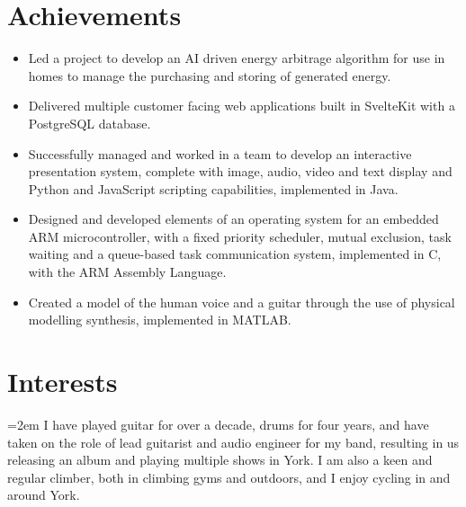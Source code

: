 \documentclass[12pt]{article} %
\newcommand{\interests}[1]{
  \vspace*{0.5em}
  \noindent\hangindent=2em\hangafter=0 \small #1 
}
\begin{document}
\section*{Achievements}
\begin{itemize}
  \item Led a project to develop an AI driven energy arbitrage algorithm for use in homes to manage the purchasing and storing of generated energy.
  \item Delivered multiple customer facing web applications built in SvelteKit with a PostgreSQL database.
  \item Successfully managed and worked in a team to develop an interactive presentation system, complete with image, audio, video and text display and Python and JavaScript scripting capabilities, implemented in Java.
  \item Designed and developed elements of an operating system for an embedded ARM microcontroller, with a fixed priority scheduler, mutual exclusion, task waiting and a queue-based task communication system, implemented in C, with the ARM Assembly Language.
  \item Created a model of the human voice and a guitar through the use of physical modelling synthesis, implemented in MATLAB.
\end{itemize}

\section*{Interests}
\interests{I have played guitar for over a decade, drums for four years, and have taken on the role of lead guitarist and audio engineer for my band, resulting in us releasing an album and playing multiple shows in York. I am also a keen and regular climber, both in climbing gyms and outdoors, and I enjoy cycling in and around York.}
\end{document}
